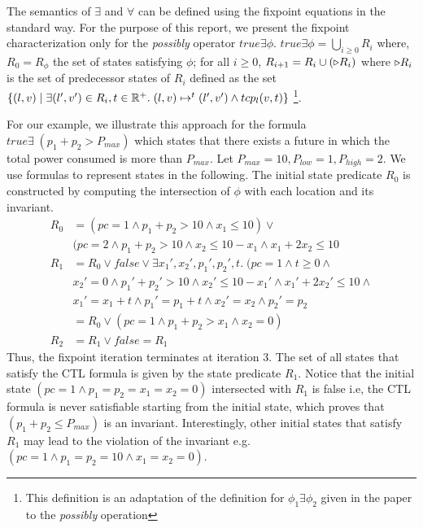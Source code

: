 The semantics of $\exists$ and $\forall$ can be defined using the fixpoint equations in the standard way.
For the purpose of this report, we present the fixpoint characterization only for 
the \emph{possibly} operator $true \exists \phi$.
$true \exists \phi = \bigcup_{i \ge 0} R_i$ where,
$R_0 = R_{\phi}$ the set of states satisfying $\phi$;
for all $i \ge 0$, $R_{i+1} = R_i \cup (\triangleright R_i)$ where $\triangleright R_i$ is the
set of predecessor states of $R_i$ defined as the set 
$\{ (l,v) \; | \; \exists (l',v') \in R_i, t \in \mathbb{R}^+. \; (l,v) \mapsto^t (l',v') \wedge tcp_l(v,t) \}$
\footnote{This definition is an adaptation of the definition for $\phi_1 \exists \phi_2$ given in the paper 
to the \emph{possibly} operation}.

For our example, we illustrate this approach for the formula $true \exists \;(p_1 + p_2 > P_{max})$ which 
states that there exists a future in which the total power consumed is more than $P_{max}$.
Let $P_{max}=10, P_{low}=1, P_{high}=2$.
We use formulas to represent states in the following.
The initial state predicate $R_0$ is constructed by computing the intersection of $\phi$ with 
each location and its invariant.
%
\begin{align*}
R_0 &= (pc = 1 \wedge p_1 + p_2 > 10 \wedge x_1 \le 10) \vee \\
	& (pc = 2 \wedge p_1 + p_2 > 10 \wedge x_2 \le 10 - x_1 \wedge x_1+2x_2 \le 10 \\
R_1 &= R_0 \vee false \vee \exists x_1',x_2',p_1',p_2',t. \; (pc=1 \wedge t \ge 0 \wedge \\
	& x_2'=0 \wedge p_1'+p_2'>10 \wedge x_2' \le 10 - x_1' \wedge x_1'+2x_2' \le 10 \wedge \\
	& x_1' = x_1 + t \wedge p_1' = p_1 + t \wedge x_2' = x_2 \wedge p_2' = p_2 \\
	&= R_0 \vee (pc=1 \wedge p_1+p_2 >x_1 \wedge x_2 = 0) \\
R_2 &= R_1 \vee false	= R_1
\end{align*}
%
Thus, the fixpoint iteration terminates at iteration 3. The set of all states that satisfy the 
CTL formula is given by the state predicate $R_1$. Notice that the initial state  
$(pc=1 \wedge p_1=p_2=x_1=x_2=0)$ intersected with $R_1$ is false i.e, the CTL formula is never
satisfiable starting from the initial state, which proves that $(p_1 + p_2 \le P_{max})$ is an invariant.
Interestingly, other initial states that satisfy $R_1$ may lead to the violation of the invariant
e.g. $(pc=1 \wedge p_1=p_2=10 \wedge x_1=x_2=0)$.